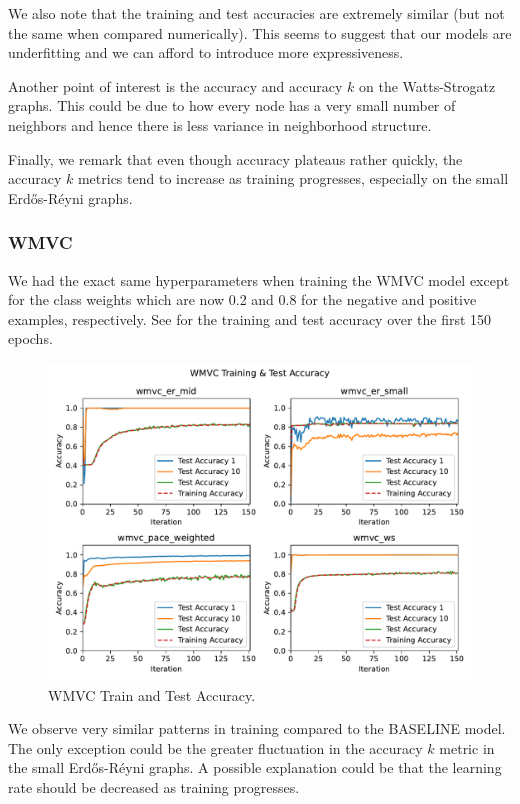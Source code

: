 \documentclass{article}
\begin{document}
We also note that the training and test accuracies are extremely similar
(but not the same when compared numerically).
This seems to suggest that our models are underfitting
and we can afford to introduce more expressiveness.

Another point of interest is the accuracy and accuracy $k$ on the Watts-Strogatz graphs.
This could be due to how every node has a very small number of neighbors
and hence there is less variance in neighborhood structure.

Finally,
we remark that even though accuracy plateaus rather quickly,
the accuracy $k$ metrics tend to increase as training progresses,
especially on the small Erd\H os-R\'eyni graphs.

\subsubsection{WMVC}
We had the exact same hyperparameters
when training the WMVC model
except for the class weights which are now 0.2 and 0.8
for the negative and positive examples,
respectively.
See  for the training and test accuracy over the first 150 epochs.

\begin{figure}
     \centering
     \includegraphics[width=\textwidth]{figures/wmvc_test}
     \caption{WMVC Train and Test Accuracy.}
     \label{fig:wmvc_test}
\end{figure}

We observe very similar patterns in training compared to the BASELINE model.
The only exception could be the greater fluctuation in the accuracy $k$ metric in the small Erd\H os-R\'eyni graphs.
A possible explanation could be that the learning rate should be decreased as training progresses.
\end{document}
